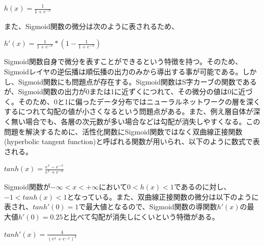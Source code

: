 \documentclass{article}
\begin{document}
\begin{center}
\begin{math}
h(x) = \frac{1}{1+e^{-x}} 
\end{math}
\end{center}


また、Sigmoid関数の微分は次のように表されるため、

\begin{center}
\begin{math}
h'(x) = \frac{1}{1+e^{-x}} * (1 - \frac{1}{1+e^{-x}})
\end{math}
\end{center}

Sigmoid関数自身で微分を表すことができるという特徴を持つ。そのため、Sigmoidレイヤの逆伝播は順伝播の出力のみから導出する事が可能である。しかし、Sigmoid関数にも問題点が存在する。Sigmoid関数はS字カーブの関数であるが、Sigmoid関数の出力が0または1に近ずくにつれて、その微分の値は0に近づく。そのため、0と1に偏ったデータ分布ではニューラルネットワークの層を深くするにつれて勾配の値が小さくなるという問題点がある。また、例え層自体が深く無い場合でも、各層の次元数が多い場合などは勾配が消失しやすくなる。この問題を解決するために、活性化関数にSigmoid関数ではなく双曲線正接関数(hyperbolic tangent function)と呼ばれる関数が用いられ、以下のように数式で表される。


\begin{center}
\begin{math}
tanh(x) =  \frac{e^{x}-e^{-x}} {e^{x}+e^{-x}} 
\end{math}
\end{center}

Sigmoid関数が\begin{math}-\infty<x<+\infty\end{math}において\begin{math}0<h(x)<1\end{math}であるのに対し、\begin{math}-1<tanh(x)<1\end{math}となっている。また、双曲線正接関数の微分は以下のように表され、\begin{math}tanh'(0)=1\end{math}で最大値となるので、Sigmoid関数の導関数\begin{math}h'(x)\end{math}の最大値\begin{math}h'(0)=0.25\end{math}と比べて勾配が消失しにくいという特徴がある。

\begin{center}
\begin{math}
tanh'(x) =  \frac{4} {(e^x+e^{-x})^{2}} 
\end{math}
\end{center}
\end{document}
